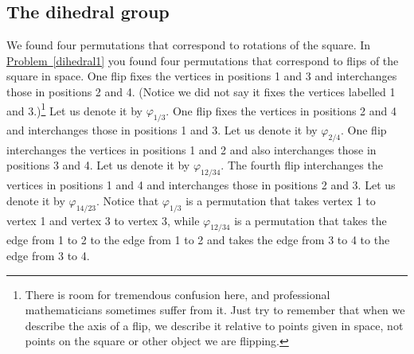 \documentclass[10pt,]{book}
\theoremstyle{plain}
\theoremstyle{definition}
\numberwithin{equation}{chapter}
\begin{document}
\subsection[{The dihedral group}]{The dihedral group}\label{subsection-60}
We found four permutations that correspond to rotations of the square. In \hyperref[dihedral1]{Problem~\ref{dihedral1}} you found four permutations that correspond to flips of the square in space. One flip fixes the vertices in positions 1 and 3 and interchanges those in positions 2 and 4. (Notice we did not say it fixes the vertices labelled 1 and 3.)\footnote{There is room for tremendous confusion here, and professional mathematicians sometimes suffer from it.  Just try to remember that when we describe the axis of a flip, we describe it relative to points given in space, not points on the square or other object we are flipping.\label{fn-19}} Let us denote it by \(\varphi_{1/3}\). One flip fixes the vertices in positions 2 and 4 and interchanges those in positions 1 and 3. Let us denote it by \(\varphi_{2/4}\). One flip interchanges the vertices in positions 1 and 2 and also interchanges those in positions 3 and 4. Let us denote it by \(\varphi_{12/34}\). The fourth flip interchanges the vertices in positions 1 and 4 and interchanges those in positions 2 and 3. Let us denote it by \(\varphi_{14/23}\). Notice that \(\varphi_{1/3}\) is a permutation that takes vertex 1 to vertex 1 and vertex 3 to vertex 3, while \(\varphi_{12/34}\) is a permutation that takes the edge from 1 to 2 to the edge from 1 to 2 and takes the edge from 3 to 4 to the edge from 3 to 4.%
\end{document}
